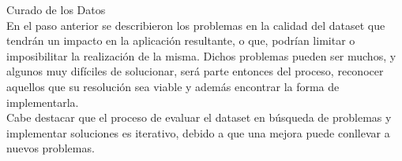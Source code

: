 Curado de los Datos\\
En el paso anterior se describieron los problemas en la calidad del dataset que tendrán un impacto en la aplicación resultante, 
o que, podrían limitar o imposibilitar la realización de la misma. Dichos problemas pueden ser muchos, y algunos muy difíciles
de solucionar, será parte entonces del proceso, reconocer aquellos que su resolución sea viable y además encontrar la forma de 
implementarla.\\
Cabe destacar que el proceso de evaluar el dataset en búsqueda de problemas y implementar soluciones es iterativo, debido a que 
una mejora puede conllevar a nuevos problemas.\\